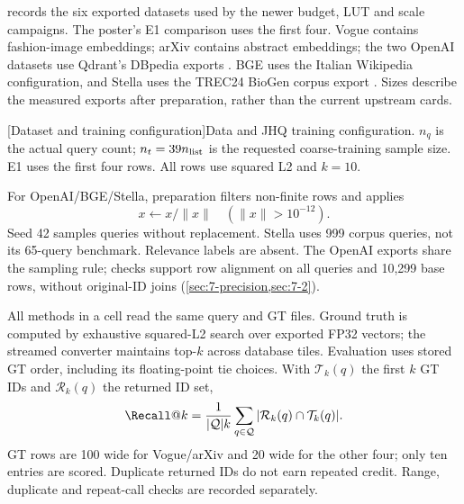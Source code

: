  records the six exported datasets used by the newer
budget, LUT and scale campaigns. The poster's E1 comparison uses the first
four. Vogue contains fashion-image embeddings; arXiv contains abstract
embeddings; the two OpenAI datasets use Qdrant's DBpedia exports
\cite{data_vogue,data_arxiv,data_openai1536,data_openai3072}.
BGE uses the Italian Wikipedia configuration, and Stella uses the
TREC24 BioGen corpus export \cite{data_bge,data_stella}. Sizes describe the
measured exports after preparation, rather than the current upstream cards.

\par\medskip\noindent\begin{minipage}{\linewidth}
\centering\captionsetup{hypcap=false}
[Dataset and training configuration]{Data and JHQ training configuration. $n_q$ is the actual query count;
$n_t=39n_{\rm list}$ is the requested coarse-training sample size. E1 uses
the first four rows. All rows use squared L2 and $k=10$.}
\label{tab:3-data}
\small\setlength{\tabcolsep}{4pt}

\end{minipage}\par\medskip

For OpenAI/BGE/Stella, preparation filters non-finite rows and applies
\[
 x\leftarrow x/\|x\|\quad(\|x\|>10^{-12}).
\]
Seed 42 samples queries without replacement. Stella uses 999 corpus queries, not its 65-query benchmark. Relevance labels are absent. The OpenAI exports share the sampling rule; checks support row alignment on all queries and 10,299 base rows, without original-ID joins (\cref{sec:7-precision,sec:7-2}).

All methods in a cell read the same query and GT files. Ground truth is
computed by exhaustive squared-L2 search over exported FP32 vectors; the
streamed converter maintains top-$k$ across database tiles. Evaluation uses
stored GT order, including its floating-point tie choices. With
$\mathcal T_k(q)$ the first $k$ GT IDs and $\mathcal R_k(q)$ the returned
ID set,
\begin{equation}
\Recall@k=\frac{1}{|\mathcal Q|k}
\sum_{q\in\mathcal Q}|\mathcal R_k(q)\cap\mathcal T_k(q)|.
\label{eq:3-recall}
\end{equation}
GT rows are 100 wide for Vogue/arXiv and 20 wide for the other four;
only ten entries are scored. Duplicate returned IDs do not earn repeated
credit. Range, duplicate and repeat-call checks are recorded separately.

